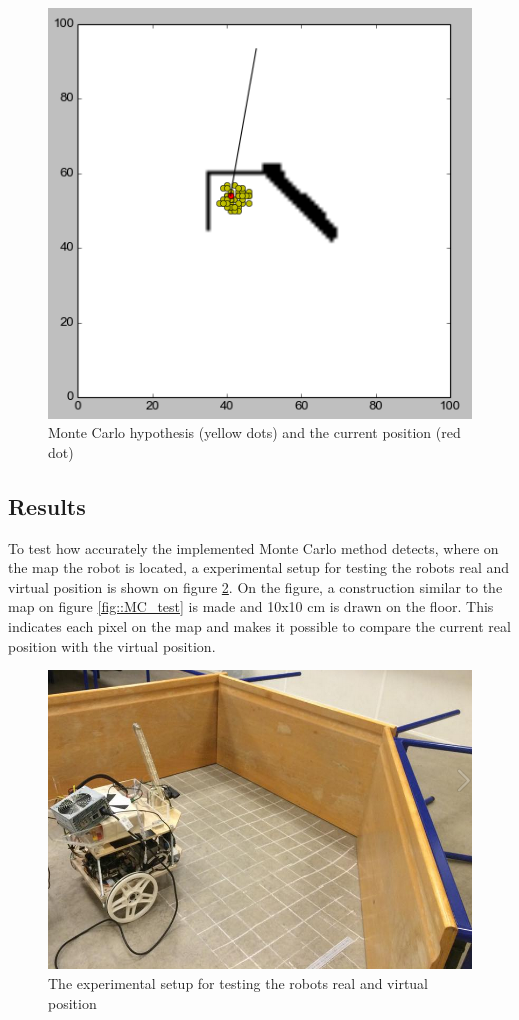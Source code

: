 \begin{figure}[H]
\centering
\includegraphics[scale=0.43]{img/MC.png}
\caption{Monte Carlo hypothesis (yellow dots) and the current position (red dot)}
\label{fig::MC}
\end{figure}

\newpage
\subsection{Results}
To test how accurately the implemented Monte Carlo method detects, where on the map the robot is located, a experimental setup for testing the robots real and virtual position is shown on figure \ref{fig::experimental}. On the figure, a construction similar to the map on figure \ref{fig::MC_test} is made and 10x10 cm is drawn on the floor. This indicates each pixel on the map and makes it possible to compare the current real position with the virtual position. 

\begin{figure}[H]
\centering 
\includegraphics[scale=0.3]{img/test.png}
\caption{The experimental setup for testing the robots real and virtual position}
\label{fig::experimental}
\end{figure}

